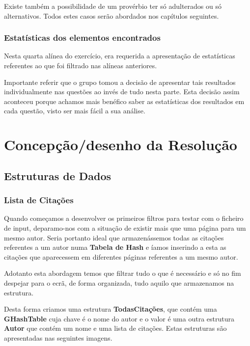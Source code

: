 \documentclass[11pt,a4paper]{report}
\begin{document}
\vspace{0.2cm}

Existe também a possibilidade de um provérbio ter só adulterados ou só alternativos. Todos estes casos serão abordados nos capítulos seguintes.

\subsection{Estatísticas dos elementos encontrados}

Nesta quarta alínea do exercício, era requerida a apresentação de estatísticas referentes ao que foi filtrado nas alíneas anteriores.

Importante referir que o grupo tomou a decisão de apresentar tais resultados individualmente nas questões ao invés de tudo nesta parte. Esta decisão assim aconteceu porque achamos mais benéfico saber as estatísticas dos resultados em cada questão, visto ser mais fácil a sua análise.





\chapter{Concepção/desenho da Resolução}
\label{chap:concepcao}

\section{Estruturas de Dados}
\subsection{Lista de Citações}

Quando começamos a desenvolver os primeiros filtros para testar com o ficheiro de input, deparamo-nos com a situação de existir mais que uma página para um mesmo autor. Seria portanto ideal que armazenássemos todas as citações referentes a um autor numa \textbf{Tabela de Hash} e íamos inserindo a esta as citações que aparecessem em diferentes páginas referentes a um mesmo autor.

Adotanto esta abordagem temos que filtrar tudo o que é necessário e só no fim despejar para o ecrã, de forma organizada, tudo aquilo que armazenamos na estrutura.

Desta forma criamos uma estrutura \textbf{TodasCitações}, que contém uma \textbf{GHashTable} cuja chave é o nome do autor e o valor é uma outra estrutura \textbf{Autor} que contém um nome e uma lista de citações. Estas estruturas são apresentadas nas seguintes imagens.
\end{document}
